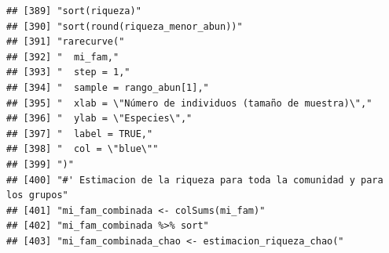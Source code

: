 \documentclass[11pt,]{article}
\begin{document}
\begin{verbatim}
## [389] "sort(riqueza)"                                                                                                                                                         
## [390] "sort(round(riqueza_menor_abun))"                                                                                                                                       
## [391] "rarecurve("                                                                                                                                                            
## [392] "  mi_fam,"                                                                                                                                                             
## [393] "  step = 1,"                                                                                                                                                           
## [394] "  sample = rango_abun[1],"                                                                                                                                             
## [395] "  xlab = \"Número de individuos (tamaño de muestra)\","                                                                                                                
## [396] "  ylab = \"Especies\","                                                                                                                                                
## [397] "  label = TRUE,"                                                                                                                                                       
## [398] "  col = \"blue\""                                                                                                                                                      
## [399] ")"                                                                                                                                                                     
## [400] "#' Estimacion de la riqueza para toda la comunidad y para los grupos"                                                                                                  
## [401] "mi_fam_combinada <- colSums(mi_fam)"                                                                                                                                   
## [402] "mi_fam_combinada %>% sort"                                                                                                                                             
## [403] "mi_fam_combinada_chao <- estimacion_riqueza_chao("                                                                                                                     

\end{verbatim}
\end{document}
